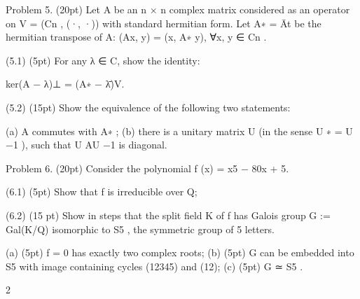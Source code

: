 \documentclass[UTF8,12pt]{ctexart}
\begin{document}
Problem 5. (20pt) Let A be an n × n complex matrix considered as an operator on V = (Cn , (·, ·)) with standard hermitian form. Let A∗ = Āt be the hermitian transpose of A: (Ax, y) = (x, A∗ y), ∀x, y ∈ Cn .

(5.1) (5pt) For any λ ∈ C, show the identity:

ker(A − λ)⊥ = (A∗ − λ̄)V.

(5.2) (15pt) Show the equivalence of the following two statements:

(a) A commutes with A∗ ; (b) there is a unitary matrix U (in the sense U ∗ = U −1 ), such that U AU −1 is diagonal.

Problem 6. (20pt) Consider the polynomial f (x) = x5 − 80x + 5.

(6.1) (5pt) Show that f is irreducible over Q;

(6.2) (15 pt) Show in steps that the split field K of f has Galois group G := Gal(K/Q) isomorphic to S5 , the symmetric group of 5 letters.

(a) (5pt) f = 0 has exactly two complex roots; (b) (5pt) G can be embedded into S5 with image containing cycles (12345) and (12); (c) (5pt) G ≃ S5 .

2
\end{document}
